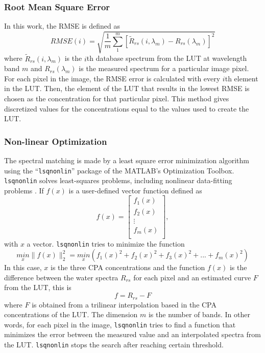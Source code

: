 \subsubsection{Root Mean Square Error}
In this work, the RMSE is defined as
\begin{equation}
  RMSE(i) = \sqrt{\frac{1}{m}\sum_1^m\left[\widetilde{R}_{rs}(i,\lambda_m)-R_{rs}(\lambda_m)\right]^2}
\end{equation}
where $\widetilde{R}_{rs}(i,\lambda_m)$ is the $i$th database spectrum from the LUT at wavelength band $m$ and $R_{rs}(\lambda_m)$ is the measured spectrum for a particular image pixel. For each pixel in the image, the RMSE error is calculated with every $i$th element in the LUT. Then, the element of the LUT that results in the lowest RMSE is chosen as the concentration for that particular pixel. This method gives discretized values for the concentrations equal to the values used to create the LUT.

\subsubsection{Non-linear Optimization}
The spectral matching is made by a least square error minimization algorithm using the ``\texttt{lsqnonlin}'' package of the MATLAB's Optimization Toolbox. \texttt{lsqnonlin} solves least-squares problems, including nonlinear data-fitting problems . If $f(x)$ is a user-defined vector function defined as
\begin{equation}
  f(x)=
  \left[
    \begin{array}{c}
      f_1(x) \\
      f_2(x) \\
      \vdots \\
      f_m(x) \\
    \end{array}
  \right],
\end{equation}
with $x$ a vector. \texttt{lsqnonlin} tries to minimize the function
\begin{equation}
  \underset{x}{min}\parallel f(x) \parallel^2_2=\underset{x}{min}(f_1(x)^2+f_2(x)^2+f_3(x)^2+...+f_m(x)^2)
\end{equation}
In this case, $x$ is the three CPA concentrations and the function $f(x)$ is the difference between the water spectra $R_{rs}$ for each pixel and an estimated curve $F$ from the LUT, this is
\begin{equation}
  f = R_{rs} - F
\end{equation}
where $F$ is obtained from a trilinear interpolation based in the CPA concentrations of the LUT. The dimension $m$ is the number of bands. In other words, for each pixel in the image, \texttt{lsqnonlin} tries to find a function that minimizes the error between the measured value and an interpolated spectra from the LUT. \texttt{lsqnonlin} stops the search after reaching certain threshold. 

